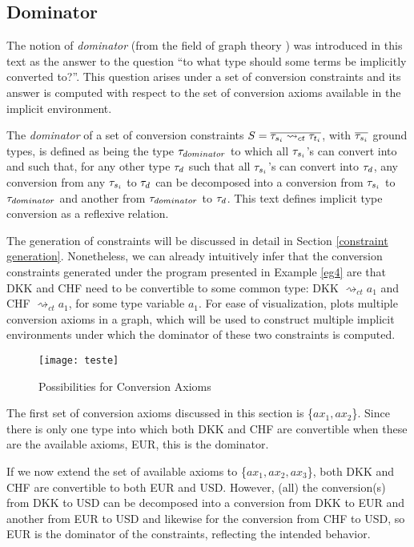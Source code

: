 \subsection{Dominator}
\label{dom4}
The notion of \textit{dominator} (from the field of graph theory \cite{dominator}) was introduced in this text as the answer to the question ``to what type should some terms be implicitly converted to?''. This question arises under a set of conversion constraints and its answer is computed with respect to the set of conversion axioms available in the implicit environment.

The \textit{dominator} of a set of conversion constraints $S=\overline{\mathit{\tau}_{s_i}\rightsquigarrow_{ct} \mathit{\tau}_{t_i}}$, with $\overline{\mathit{\tau}_{s_i}}$ ground types, is defined as being the type $\mathit{\tau}_{dominator}$ to which all $\mathit{\tau}_{s_i}$'s can convert into and such that, for any other type $\mathit{\tau}_d$ such that  all $\mathit{\tau}_{s_i}$'s can convert into $\mathit{\tau}_d$, any conversion from any $\mathit{\tau}_{s_i}$ to $\mathit{\tau}_d$ can be decomposed into a conversion from $\mathit{\tau}_{s_i}$ to $\mathit{\tau}_{dominator}$ and another from $\mathit{\tau}_{dominator}$ to $\mathit{\tau}_d$. This text defines implicit type conversion as a reflexive relation.

The generation of constraints will be discussed in detail in Section \ref{constraint generation}. Nonetheless, we can already intuitively infer that the conversion constraints generated under the program presented in Example \ref{eg4} are that DKK and CHF need to be convertible to some common type: DKK $\rightsquigarrow_{ct} a_1$ and CHF $\rightsquigarrow_{ct} a_1$, for some type variable $a_1$. For ease of visualization,  plots multiple conversion axioms in a graph, which will be used to construct multiple implicit environments under which the dominator of these two constraints is computed.
\begin{figure}
  \centering
  \texttt{[image: teste]}
  \caption{Possibilities for Conversion Axioms}
  \label{dom4pic}
\end{figure}

The first set of conversion axioms discussed in this section is \{$ax_1,ax_2$\}. Since there is only one type into which both DKK and CHF are convertible when these are the available axioms, EUR, this is the dominator.

If we now extend the set of available axioms to \{$ax_1,ax_2,ax_3$\}, both DKK and CHF are convertible to both EUR and USD. However, (all) the conversion(s) from DKK to USD can be decomposed into a conversion from DKK to EUR and another from EUR to USD and likewise for the conversion from CHF to USD, so EUR is the dominator of the constraints, reflecting the intended behavior.

